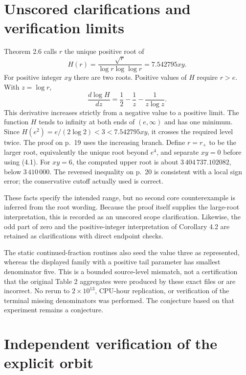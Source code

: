 \documentclass[10pt]{article}
\begin{document}
\section*{Unscored clarifications and verification limits}
Theorem 2.6 calls \(r\) the unique positive root of \[H(r)=\frac{\sqrt r}{\log r\log\log r}=7.542795xy.
 \tag{4.1}\] For positive integer \(xy\) there are two roots. Positive values of \(H\) require \(r>e\). With \(z=\log r\), \[\frac{d\log H}{dz}=\frac12-\frac1z-\frac1{z\log z}.\] This derivative increases strictly from a negative value to a positive limit. The function \(H\) tends to infinity at both ends of \((e,\infty)\) and has one minimum. Since \(H(e^2)=e/(2\log2)<3<7.542795xy\), it crosses the required level twice. The proof on p. 19 uses the increasing branch. Define \(r=r_+\) to be the larger root, equivalently the unique root beyond \(e^4\), and separate \(xy=0\) before using (4.1). For \(xy=6\), the computed upper root is about \(3\,404\,737.102082\), below \(3\,410\,000\). The reversed inequality on p. 20 is consistent with a local sign error; the conservative cutoff actually used is correct.\par
These facts specify the intended range, but no second core counterexample is inferred from the root wording. Because the proof itself supplies the large-root interpretation, this is recorded as an unscored scope clarification. Likewise, the odd part of zero and the positive-integer interpretation of Corollary 4.2 are retained as clarifications with direct endpoint checks.\par
The static continued-fraction routines also seed the value three as represented, whereas the displayed family with a positive tail parameter has smallest denominator five. This is a bounded source-level mismatch, not a certification that the original Table 2 aggregates were produced by these exact files or are incorrect. No rerun to \(2\times10^{13}\), CPU-hour replication, or verification of the terminal missing denominators was performed. The conjecture based on that experiment remains a conjecture.\par
\section*{Independent verification of the explicit orbit}
\end{document}
